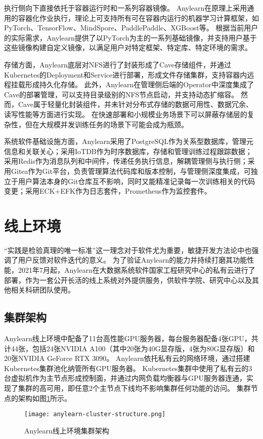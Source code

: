 执行侧向下直接依托于容器运行时和一系列容器镜像。
Anylearn在原理上采用通用的容器化作业执行，理论上可支持所有可在容器内运行的机器学习计算框架，如PyTorch、TensorFlow、MindSpore、PaddlePaddle、XGBoost等。
根据当前用户的实际需求，Anylearn提供了以PyTorch为主的一系列基础镜像，并支持用户基于这些镜像构建自定义镜像，以满足用户对特定框架、特定库、特定环境的需求。

存储方面，Anylearn底层对NFS进行了封装形成了Cave存储组件，并通过Kubernetes的Deployment和Service进行部署，形成文件存储集群，支持容器内远程挂载形成持久化存储。
此外，Anylearn在管理侧后端的Operator中深度集成了Cave的部署管理，可以支持目录级别的NFS节点启动，并支持动态扩缩容。
然而，Cave属于轻量化封装组件，并未针对分布式存储的数据可用性、数据冗余、读写性能等方面进行实现。
在快速部署和小规模业务场景下可以屏蔽存储层的复杂性，但在大规模并发训练任务的场景下可能会成为瓶颈。

系统软件基础设施方面，Anylearn采用了PostgreSQL作为关系型数据库，管理元信息和关联关心；采用IoTDB作为时序数据库，存储和管理训练过程跟踪数据；采用Redis作为消息队列和中间件，传递任务执行信息，解耦管理侧与执行侧；采用Gitea作为Git平台，负责管理算法代码库和版本控制，与管理侧深度集成，可独立于用户算法本身的Git仓库互不影响，同时又能精准记录每一次训练相关的代码变更；采用ECK+EFK作为日志套件，Prometheus作为监控套件。


\section{线上环境}

“实践是检验真理的唯一标准”这一理念对于软件尤为重要，敏捷开发方法论中也强调了用户反馈对软件迭代的意义。
为了验证Anylearn的能力并持续打磨其功能性能，2021年7月起，Anylearn在大数据系统软件国家工程研究中心的私有云进行了部署，作为一套公开长活的线上系统对外提供服务，供软件学院、研究中心以及其他相关科研团队使用。

\subsection{集群架构}
Anylearn线上环境中配备了11台高性能GPU服务器，每台服务器配备4张GPU，共计44张，包括24张NVIDIA A100（其中20张为40G显存版，4张为80G显存版）和20张NVIDIA GeForce RTX 3090。
Anylearn依托私有云的网络环境，通过搭建Kubernetes集群池化纳管所有GPU服务器。
Kubernetes集群中使用了私有云的3台虚拟机作为主节点形成控制面，并通过内网负载均衡器与GPU服务器连通，实现了集群的高可用，即任意2个主节点下线均不影响集群任何功能的访问。
集群节点的架构如图\ref{fig:cluster}所示。

\begin{figure}
  \centering
  \texttt{[image: anylearn-cluster-structure.png]}
  \caption{Anylearn线上环境集群架构}
  \label{fig:cluster}
\end{figure}

